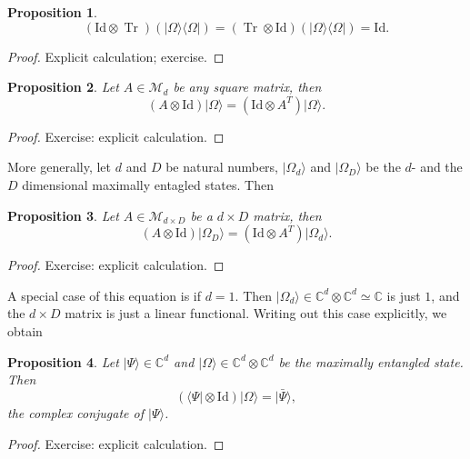 \documentclass{article}
\newtheorem{proposition}{Proposition}
\theoremstyle{definition}
\newcommand{\tr}{\operatorname{Tr}}
\newcommand{\id}{\mathrm{Id}}
\newcommand{\ket}[1]{\vert #1 \rangle}
\newcommand{\bra}[1]{\langle #1 \vert}
\begin{document}
\begin{proposition}\label{prop:max_ent_partial_tr}
  \begin{equation*}
    (\id \otimes \tr )(\ket{\Omega}\bra{\Omega}) = (\tr \otimes\id)(\ket{\Omega}\bra{\Omega})  = \id.
  \end{equation*}
\end{proposition}

\begin{proof}
  Explicit calculation; exercise.
\end{proof}

\begin{proposition}\label{prop:max_ent_pull_through}
  Let $A\in\mathcal{M}_d$ be any square matrix, then 
  \begin{equation*}
     (A \otimes \id) \ket{\Omega} = (\id\otimes A^T) \ket{\Omega}.
  \end{equation*}
\end{proposition}
\begin{proof}
   Exercise: explicit calculation.
\end{proof}
More generally, let $d$ and $D$ be natural numbers, $\ket{\Omega_d}$ and $\ket{\Omega_D}$ be the $d$- and the $D$ dimensional maximally entagled states. Then
\begin{proposition}
  Let $A\in\mathcal{M}_{d\times D}$ be a $d\times D$ matrix, then 
  \begin{equation*}
    (A \otimes \id) \ket{\Omega_D} = (\id\otimes A^T) \ket{\Omega_d}.
  \end{equation*}
\end{proposition}
\begin{proof}
  Exercise: explicit calculation.
\end{proof}
A special case of this equation is if $d=1$. Then $\ket{\Omega_d} \in \mathbb{C}^d\otimes \mathbb{C}^d \simeq \mathbb{C}$ is just $1$, and the $d\times D$ matrix is just a linear functional. Writing out this case explicitly, we obtain 
\begin{proposition}\label{prop:max_ent_pull_through_lin_fcn}
  Let $\ket{\Psi}\in\mathbb{C}^{d}$ and $\ket{\Omega}\in \mathbb{C}^d \otimes \mathbb{C}^d$ be the maximally entangled state. Then 
  \begin{equation*}
    (\bra{\Psi} \otimes \id) \ket{\Omega} = \ket{\bar{\Psi}},
  \end{equation*}
  the complex conjugate of $\ket{\Psi}$.
\end{proposition}
\begin{proof}
  Exercise: explicit calculation.
\end{proof}
\end{document}
